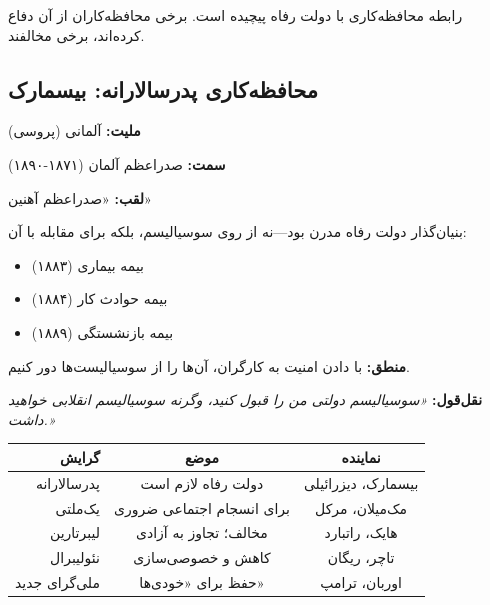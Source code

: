 رابطه محافظه‌کاری با دولت رفاه پیچیده است. برخی محافظه‌کاران از آن دفاع کرده‌اند، برخی مخالفند.

\subsection{محافظه‌کاری پدرسالارانه: بیسمارک}

\begin{personbox}

\textbf{ملیت:} آلمانی (پروسی)

\textbf{سمت:} صدراعظم آلمان (۱۸۷۱-۱۸۹۰)

\textbf{لقب:} «صدراعظم آهنین»

\mediumspace

 بنیان‌گذار دولت رفاه مدرن بود—نه از روی سوسیالیسم، بلکه برای مقابله با آن:

\begin{itemize}[nosep]
    \item بیمه بیماری (۱۸۸۳)
    \item بیمه حوادث کار (۱۸۸۴)
    \item بیمه بازنشستگی (۱۸۸۹)
\end{itemize}

\textbf{منطق:} با دادن امنیت به کارگران، آن‌ها را از سوسیالیست‌ها دور کنیم.

\textbf{نقل‌قول:} \textit{«سوسیالیسم دولتی من را قبول کنید، وگرنه سوسیالیسم انقلابی خواهید داشت.»}
\end{personbox}

\begin{comparebox}
\begin{table}[H]
\centering
\small
\begin{tabular}{r|c|c}
\toprule
\textbf{گرایش} & \textbf{موضع} & \textbf{نماینده} \\
\midrule
پدرسالارانه & دولت رفاه لازم است & بیسمارک، دیزرائیلی \\
یک‌ملتی & برای انسجام اجتماعی ضروری & مک‌میلان، مرکل \\
لیبرتارین & مخالف؛ تجاوز به آزادی & هایک، راتبارد \\
نئولیبرال & کاهش و خصوصی‌سازی & تاچر، ریگان \\
ملی‌گرای جدید & حفظ برای «خودی‌ها» & اوربان، ترامپ \\
\bottomrule
\end{tabular}
\end{table}
\end{comparebox}

